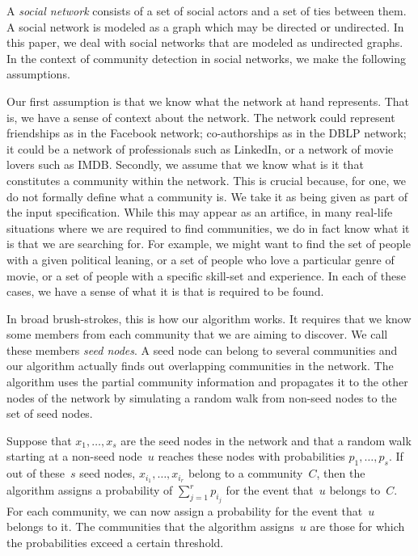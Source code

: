 A \emph{social network} consists of a set of social actors and a set of ties 
between them. A social network is modeled as a graph which may be directed 
or undirected. In this paper, we deal with social networks that are modeled as undirected 
graphs. In the context of community detection in social networks, we make 
the following assumptions. 

Our first assumption is that we know what the network at hand represents. That is, 
we have a sense of context about the network. The network could represent 
friendships as in the Facebook network; co-authorships as in the DBLP network; 
it could be a network of professionals such as LinkedIn, or a network of movie 
lovers such as IMDB. Secondly, we assume that we know what is it that constitutes 
a community within the network. This is crucial because, for one, we do not 
formally define what a community is. We take it as being given as part of the 
input specification. While this may appear as an artifice, in many real-life situations 
where we are required to find communities, we do in fact know what 
it is that we are searching for. For example, we might want to find the set of 
people with a given political leaning, or a set of people who love a particular 
genre of movie, or a set of people with a specific skill-set and experience. 
In each of these cases, we have a sense of what it is that is required to be found. 

In broad brush-strokes, this is how our algorithm works.  It requires that we know
some members from each community that we are aiming to discover. We call these members 
\emph{seed nodes}. A seed node can belong to several communities and our algorithm 
actually finds out overlapping communities in the network. The algorithm uses the 
partial community information and propagates it to the other nodes of the network 
by simulating a random walk from non-seed nodes to the set of seed nodes. 

Suppose that $x_1, \ldots, x_s$ are the seed nodes in the network and that a random walk starting at 
a non-seed node~$u$ reaches these nodes with probabilities $p_1, \ldots, p_s$. If out 
of these~$s$ seed nodes, $x_{i_1}, \ldots, x_{i_r}$ belong to a community~$C$, then 
the algorithm assigns a probability of $\sum_{j = 1}^r p_{i_j}$ for the event 
that~$u$ belongs to~$C$. For each community, we can now assign a probability for 
the event that~$u$ belongs to it. The communities that the algorithm 
assigns~$u$ are those for which the probabilities exceed a certain threshold. 

